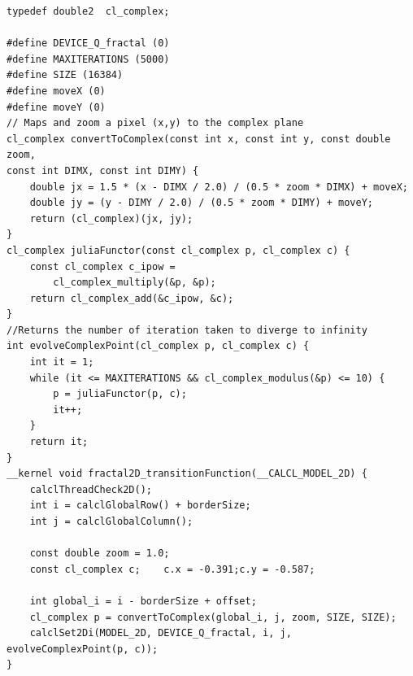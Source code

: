 \begin{lstlisting}
typedef double2  cl_complex;

#define DEVICE_Q_fractal (0)
#define MAXITERATIONS (5000)
#define SIZE (16384)
#define moveX (0)
#define moveY (0)
// Maps and zoom a pixel (x,y) to the complex plane
cl_complex convertToComplex(const int x, const int y, const double zoom,
const int DIMX, const int DIMY) {
    double jx = 1.5 * (x - DIMX / 2.0) / (0.5 * zoom * DIMX) + moveX;
    double jy = (y - DIMY / 2.0) / (0.5 * zoom * DIMY) + moveY;
    return (cl_complex)(jx, jy);
}
cl_complex juliaFunctor(const cl_complex p, cl_complex c) {
    const cl_complex c_ipow =
        cl_complex_multiply(&p, &p); 
    return cl_complex_add(&c_ipow, &c);
}
//Returns the number of iteration taken to diverge to infinity 
int evolveComplexPoint(cl_complex p, cl_complex c) {
    int it = 1;
    while (it <= MAXITERATIONS && cl_complex_modulus(&p) <= 10) {
        p = juliaFunctor(p, c);
        it++;
    }
    return it;
}
__kernel void fractal2D_transitionFunction(__CALCL_MODEL_2D) {
    calclThreadCheck2D();
    int i = calclGlobalRow() + borderSize;
    int j = calclGlobalColumn();
    
    const double zoom = 1.0;
    const cl_complex c;    c.x = -0.391;c.y = -0.587;
    
    int global_i = i - borderSize + offset;
    cl_complex p = convertToComplex(global_i, j, zoom, SIZE, SIZE);
    calclSet2Di(MODEL_2D, DEVICE_Q_fractal, i, j, evolveComplexPoint(p, c));
}
\end{lstlisting}


